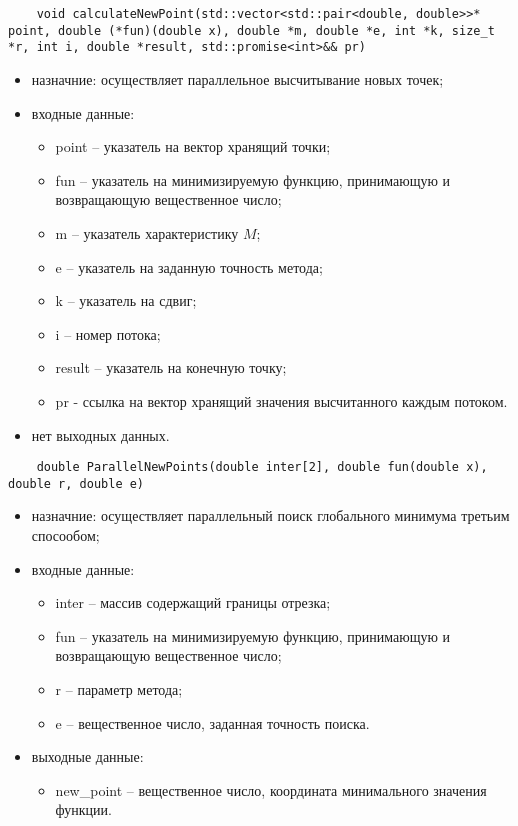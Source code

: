 \documentclass{report}
\begin{document}
\begin{lstlisting}
    void calculateNewPoint(std::vector<std::pair<double, double>>* point, double (*fun)(double x), double *m, double *e, int *k, size_t *r, int i, double *result, std::promise<int>&& pr)
\end{lstlisting}
\begin{itemize}
    \item назначние: осуществляет параллельное высчитывание новых точек;
    \item входные данные:
        \begin{itemize}	
            \item point – указатель на вектор хранящий точки;
            \item fun – указатель на минимизируемую функцию, принимающую и возвращающую вещественное число;
            \item m – указатель характеристику $M$;
            \item e – указатель на заданную точность метода;
            \item k – указатель на сдвиг;
            \item i – номер потока;
            \item result – указатель на конечную точку;
            \item pr - ссылка на вектор хранящий значения высчитанного каждым потоком.
        \end{itemize}
    \item нет выходных данных.
\end{itemize}

\begin{lstlisting}
    double ParallelNewPoints(double inter[2], double fun(double x), double r, double e)
\end{lstlisting}
\begin{itemize}
    \item назначние: осуществляет параллельный поиск глобального минимума третьим спосообом;
    \item входные данные:
        \begin{itemize}	
            \item inter – массив содержащий границы отрезка;
            \item fun – указатель на минимизируемую функцию, принимающую и возвращающую вещественное число;
            \item r – параметр метода;
            \item e – вещественное число, заданная точность поиска.
        \end{itemize}
    \item выходные данные:
        \begin{itemize}
            \item new\_point – вещественное число, координата минимального значения функции.
        \end{itemize}
\end{itemize}
\newpage
\end{document}
